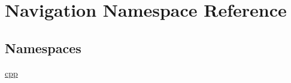 \hypertarget{namespaceNavigation}{}\section{Navigation Namespace Reference}
\label{namespaceNavigation}
\subsection*{Namespaces}
\begin{DoxyCompactItemize}
\item 
 \hyperlink{namespaceNavigation_1_1cpp}{cpp}
\end{DoxyCompactItemize}
